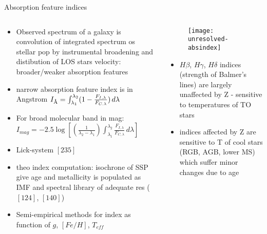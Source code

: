 \begin{frame}{Absorption feature indices}
\begin{columns}\begin{column}{0.5\textwidth}
\begin{itemize}
\item Observed spectrum of a galaxy is convolution of integrated spectrum os stellar pop by instrumental broadening and distibution of LOS stars velocity: broader/weaker absorption features
\item narrow absorption feature index is in Angstrom
$I_{\textup{\AA}}=\int_{\lambda_1}^{\lambda_2}(1-\frac{F_{I,\lambda}}{F_{C.\lambda}})\,d\lambda$
\item For broad molecular band in mag: $I_{mag}=-2.5\log{[(\frac{1}{\lambda_2-\lambda_1})\int_{\lambda_1}^{\lambda_2}\frac{F_{I,\lambda}}{F_{C,\lambda}}\,d\lambda]}$
\item Lick-system $[235]$
\item theo index computation: isochrone of SSP give age and metallicity is populated as IMF and spectral library of adequate res ($[124]$, $[140]$)
\item Semi-empirical methods for index as function of $g$, $[Fe/H]$, $T_{eff}$
\end{itemize} 
\end{column} \begin{column}{0.5\textwidth}
\begin{figure}[!ht]
\texttt{[image: unresolved-absindex]}
\end{figure}
\begin{itemize}
\item $H\beta$, $H\gamma$, $H\delta$ indices (strength of Balmer's lines) are largely unaffected by Z - sensitive to temperatures of TO stars
\item indices affected by Z are sensitive to T of cool stars (RGB, AGB, lower MS) which suffer minor changes due to age
\end{itemize}
\end{column}\end{columns}
\end{frame}
